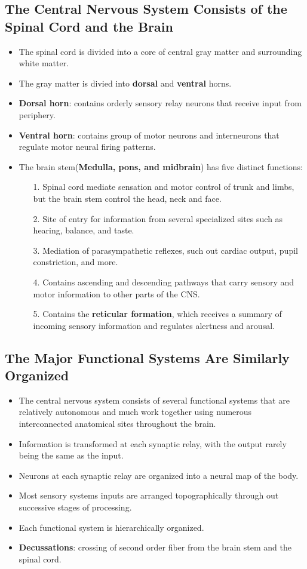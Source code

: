 \documentclass[12pt,a4paper]{article}
\begin{document}
\subsection{The Central Nervous System Consists of the Spinal Cord and the Brain}
\begin{itemize}
    \item The spinal cord is divided into a core of central gray matter and surrounding white matter.
    \item The gray matter is divied into \textbf{dorsal} and \textbf{ventral} horns.
    \item \textbf{Dorsal horn}: contains orderly sensory relay neurons that receive input from periphery.
    \item \textbf{Ventral horn}: contains group of motor neurons and interneurons that regulate motor neural firing patterns.
    \item The brain stem(\textbf{Medulla, pons, and midbrain}) has five distinct functions:
        \begin{itemize}
            \item[1.] Spinal cord mediate sensation and motor control of trunk and limbs, but the brain stem control the head, neck and face.
            \item[2.] Site of entry for information from several specialized sites such as hearing, balance, and taste.
            \item[3.] Mediation of parasympathetic reflexes, such out cardiac output, pupil constriction, and more.
            \item[4.] Contains ascending and descending pathways that carry sensory and motor information to other parts of the CNS.
            \item[5.] Contains the \textbf{reticular formation}, which receives a summary of incoming sensory information and regulates alertness and arousal.    
        \end{itemize}
\end{itemize}
\subsection{The Major Functional Systems Are Similarly Organized}
\begin{itemize}
    \item The central nervous system consists of several functional systems that are relatively autonomous and much work together using numerous interconnected anatomical sites throughout the brain.
    \item Information is transformed at each synaptic relay, with the output rarely being the same as the input.
    \item Neurons at each synaptic relay are organized into a neural map of the body.
    \item Most sensory systems inputs are arranged topographically through out successive stages of processing.
    \item Each functional system is hierarchically organized.
    \item \textbf{Decussations}: crossing of second order fiber from the brain stem and the spinal cord.
\end{itemize}
\end{document}
